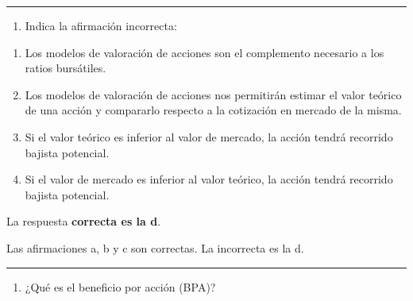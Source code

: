 \documentclass[
  letterpaper,
  DIV=11,
  numbers=noendperiod]{scrreprt}
\providecommand{\tightlist}{%
  \setlength{\itemsep}{0pt}\setlength{\parskip}{0pt}}\usepackage{longtable,booktabs,array}
\begin{document}
\begin{center}\rule{0.5\linewidth}{0.5pt}\end{center}

\begin{enumerate}
\def\labelenumi{\arabic{enumi}.}
\setcounter{enumi}{80}
\tightlist
\item
  Indica la afirmación incorrecta:
\end{enumerate}

\begin{enumerate}
\def\labelenumi{\alph{enumi}.}
\item
  Los modelos de valoración de acciones son el complemento necesario a
  los ratios bursátiles.
\item
  Los modelos de valoración de acciones nos permitirán estimar el valor
  teórico de una acción y compararlo respecto a la cotización en mercado
  de la misma.
\item
  Si el valor teórico es inferior al valor de mercado, la acción tendrá
  recorrido bajista potencial.
\item
  Si el valor de mercado es inferior al valor teórico, la acción tendrá
  recorrido bajista potencial.
\end{enumerate}

\begin{tcolorbox}[enhanced jigsaw, left=2mm, opacityback=0, colback=white, breakable, arc=.35mm, bottomrule=.15mm, rightrule=.15mm, toprule=.15mm, leftrule=.75mm, colframe=quarto-callout-tip-color-frame]
\begin{minipage}[t]{5.5mm}
\textcolor{quarto-callout-tip-color}{\faLightbulb}
\end{minipage}%
\begin{minipage}[t]{\textwidth - 5.5mm}

La respuesta \textbf{correcta es la d}.

Las afirmaciones a, b y c son correctas. La incorrecta es la d.

\end{minipage}%
\end{tcolorbox}

\begin{center}\rule{0.5\linewidth}{0.5pt}\end{center}

\begin{enumerate}
\def\labelenumi{\arabic{enumi}.}
\setcounter{enumi}{81}
\tightlist
\item
  ¿Qué es el beneficio por acción (BPA)?
\end{enumerate}
\end{document}
